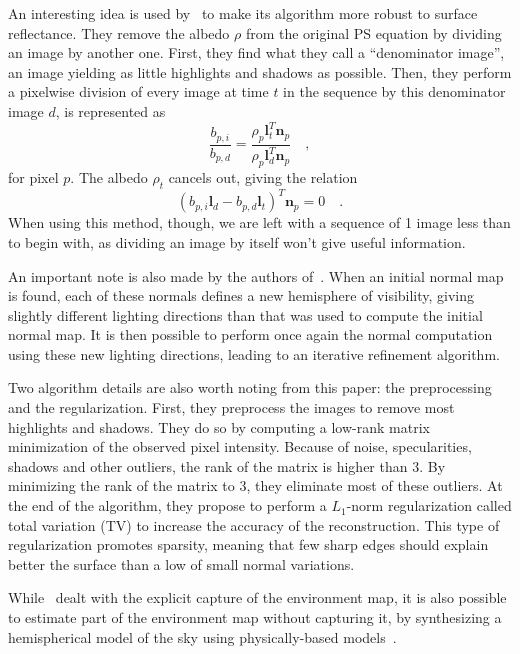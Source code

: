 An interesting idea is used by~\cite{yu-iccp-13} to make its algorithm more robust to surface reflectance. They remove the albedo $\rho$ from the original PS equation by dividing an image by another one. First, they find what they call a ``denominator image'', an image yielding as little highlights and shadows as possible. Then, they perform a pixelwise division of every image at time $t$ in the sequence by this denominator image $d$, is represented as
\begin{equation}
\frac{b_{p,i}}{b_{p,d}} = \frac{\rho_p \mathbf{l}_t^T \mathbf{n}_p}{\rho_p \mathbf{l}_d^T \mathbf{n}_p} \quad,
\end{equation}
for pixel $p$. The albedo $\rho_t$ cancels out, giving the relation
\begin{equation}
\left( b_{p,i} \mathbf{l}_d - b_{p,d} \mathbf{l}_t \right)^T \mathbf{n}_p = 0  \quad.
\end{equation}
When using this method, though, we are left with a sequence of 1 image less than to begin with, as dividing an image by itself won't give useful information.

An important note is also made by the authors of~\cite{yu-iccp-13}. When an initial normal map is found, each of these normals defines a new hemisphere of visibility, giving slightly different lighting directions than that was used to compute the initial normal map. It is then possible to perform once again the normal computation using these new lighting directions, leading to an iterative refinement algorithm.

Two algorithm details are also worth noting from this paper: the preprocessing and the regularization. First, they preprocess the images to remove most highlights and shadows. They do so by computing a low-rank matrix minimization of the observed pixel intensity. Because of noise, specularities, shadows and other outliers, the rank of the matrix is higher than 3. By minimizing the rank of the matrix to 3, they eliminate most of these outliers. At the end of the algorithm, they propose to perform a $L_1$-norm regularization called total variation (TV) to increase the accuracy of the reconstruction. This type of regularization promotes sparsity, meaning that few sharp edges should explain better the surface than a low of small normal variations.

While~\cite{yu-iccp-13} dealt with the explicit capture of the environment map, it is also possible to estimate part of the environment map without capturing it, by synthesizing a hemispherical model of the sky using physically-based models~\cite{inose-tcva-13,jung-cvpr-15}.

